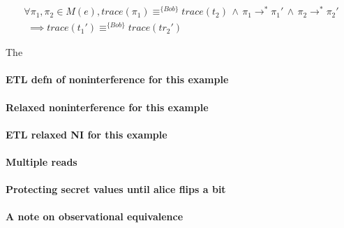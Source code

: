 \documentclass[conference]{IEEEtran}
\theoremstyle{definition}
\newcommand{\tr}{t}
\begin{document}
\begin{displaymath}
  \begin{array}{l}
    \forall \pi_1, \pi_2 \in M(e),
    trace(\pi_1) \equiv^{\{Bob\}} trace(\tr_2)
    \, \wedge \, \pi_1 \rightarrow^\ast \pi_1'
    \, \wedge \, \pi_2 \rightarrow^\ast \pi_2' \\
    \, \, \implies trace(\tr_1') \equiv^{\{Bob\}} trace(tr_2')
  \end{array}
\end{displaymath}

The 


\paragraph{ETL defn of noninterference for this example}


\paragraph{Relaxed noninterference for this example}


\paragraph{ETL relaxed NI for this example}


\paragraph{Multiple reads}


\paragraph{Protecting secret values until alice flips a bit}



\paragraph{A note on observational equivalence}
\end{document}
